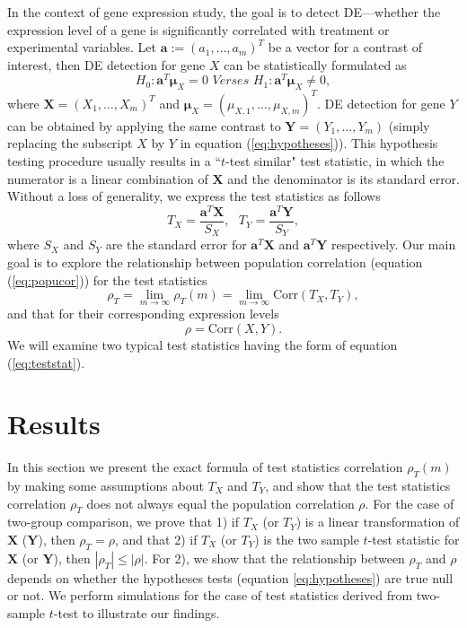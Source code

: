 \documentclass[12pt, a4paper]{article}
\newcommand{\cor}{\text{Corr}}
\begin{document}
	 In the context of gene expression study, the goal is to detect DE---whether the expression 
	 level of a gene is 
	 significantly correlated with treatment or experimental variables. Let $\bm a:=(a_1, \ldots, 
	 a_m)^T$ be a vector for a contrast of 
	 interest, then DE detection for gene $X$ can be statistically formulated as 
	 \begin{equation}\label{eq:hypotheses}
	 H_{0}:  \bm a^T\bm \mu_X = 0 \textit{     Verses   }  H_{1}: \bm a^T\bm \mu_X \neq 0,
	 \end{equation}
	 where $\bm X = (X_1, \ldots, X_m)^T$ and $\bm \mu_{X} = (\mu_{X, 1}, \ldots, \mu_{X, m})^T$. 
	 DE detection for gene $Y$ can be obtained by applying the same contrast to $\bm Y = (Y_1, 
	 \ldots, Y_m)$ (simply replacing the subscript $X$ by $Y$ in equation (\ref{eq:hypotheses})).
	This hypothesis testing procedure usually results in a ``$t$-test similar" test statistic, in which the numerator is a linear combination of 
	$\bm X$ and the denominator is its standard error. Without a loss of generality, we express the test statistics as follows
	\begin{equation}\label{eq:teststat}
	T_X = \dfrac{\bm a^T\bm X}{S_X},  ~~~ T_Y = \dfrac{\bm a^T \bm Y}{S_Y},
	\end{equation}  
	where $S_X$ and $S_Y$ are the standard error for $\bm a^T\bm X$ and $\bm a^T\bm Y$ 
	respectively.	
	Our main goal is to explore the relationship between population correlation (equation 
	(\ref{eq:popucor})) for the test statistics 
	\begin{equation}
	\rho_T= \lim\limits_{m\rightarrow\infty}\rho_T(m) = \lim\limits_{m\rightarrow\infty}\cor({T_X, 
	T_Y}),
	\end{equation}  
	and that for their corresponding expression levels 
	\begin{equation}
	\rho = \cor(X, Y). 
	\end{equation}
	We will examine two typical test statistics having the form of equation (\ref{eq:teststat}).%
		

	
	\section{Results}\label{section:tcorresults}
	
	In this section we present the exact formula of test statistics correlation $\rho_T(m)$ by 
	making some assumptions about $T_X$ and $T_Y$, and show that the test statistics correlation 
	$\rho_T$ does not always equal the population correlation $\rho$. For the case of two-group 
	comparison, we prove that 1) if $T_X$ (or $T_Y$) is a linear transformation of $\bm X$ ($\bm 
	Y$), 
	then $\rho_T= \rho$, and that 2) if $T_X$ (or $T_Y$) is the two sample $t$-test statistic for 
	$\bm 
	X$ (or $\bm Y$), then $|\rho_T| \leq |\rho|$. For 2), we show that the relationship between 
	$\rho_T$ and $\rho$ depends on whether the hypotheses tests (equation \ref{eq:hypotheses}) are 
	true null or not. We perform simulations for the case of test statistics derived from 
	two-sample $t$-test to illustrate our findings.
	
\end{document}
